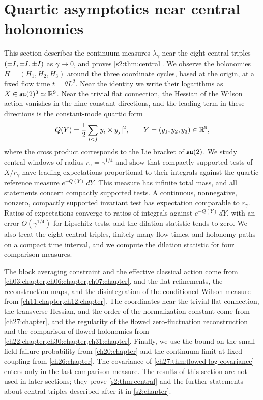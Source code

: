 \chapter{Quartic asymptotics near central holonomies}\label{ch32:chapter}

This section describes the continuum measures $\lambda_\gamma$ near the eight central triples $(\pm I,\pm I,\pm I)$ as $\gamma\to0$, and proves \cref{s2:thm:central}. We observe the holonomies $H=(H_1,H_2,H_3)$ around the three coordinate cycles, based at the origin, at a fixed flow time $t=\theta L^2$. Near the identity we write their logarithms as $X\in\mathfrak{su}(2)^3\simeq\mathbb R^9$. Near the trivial flat connection, the Hessian of the Wilson action vanishes in the nine constant directions, and the leading term in these directions is the constant-mode quartic form
\begin{equation*}
 Q(Y)=\frac12\sum_{i<j}\lvert y_i\times y_j\rvert^2,\qquad Y=(y_1,y_2,y_3)\in\mathbb R^9,
\end{equation*}
where the cross product corresponds to the Lie bracket of $\mathfrak{su}(2)$. We study central windows of radius $r_\gamma=\gamma^{1/4}$ and show that compactly supported tests of $X/r_\gamma$ have leading expectations proportional to their integrals against the quartic reference measure $e^{-Q(Y)}\,dY$. This measure has infinite total mass, and all statements concern compactly supported tests. A continuous, nonnegative, nonzero, compactly supported invariant test has expectation comparable to $r_\gamma$. Ratios of expectations converge to ratios of integrals against $e^{-Q(Y)}\,dY$, with an error $O(\gamma^{1/4})$ for Lipschitz tests, and the dilation statistic tends to zero. We also treat the eight central triples, finitely many flow times, and holonomy paths on a compact time interval, and we compute the dilation statistic for four comparison measures.

The block averaging constraint and the effective classical action come from \cref{ch03:chapter,ch06:chapter,ch07:chapter}, and the flat refinements, the reconstruction maps, and the disintegration of the conditioned Wilson measure from \cref{ch11:chapter,ch12:chapter}. The coordinates near the trivial flat connection, the transverse Hessian, and the order of the normalization constant come from \cref{ch27:chapter}, and the regularity of the flowed zero-fluctuation reconstruction and the comparison of flowed holonomies from \cref{ch22:chapter,ch30:chapter,ch31:chapter}. Finally, we use the bound on the small-field failure probability from \cref{ch20:chapter} and the continuum limit at fixed coupling from \cref{ch26:chapter}. The covariance of \cref{ch27:thm:flowed-log-covariance} enters only in the last comparison measure. The results of this section are not used in later sections; they prove \cref{s2:thm:central} and the further statements about central triples described after it in \cref{s2:chapter}.

